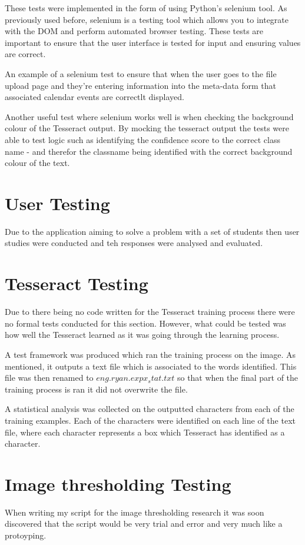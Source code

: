 These tests were implemented in the form of using Python's selenium tool. As previously used before, selenium is a testing tool which allows you to integrate with the DOM and perform automated browser testing. These tests are important to ensure that the user interface is tested for input and ensuring values are correct.

An example of a selenium test to ensure that when the user goes to the file upload page and they're entering information into the meta-data form that associated calendar events are correctlt displayed.

Another useful test where selenium works well is when checking the background colour of the Tesseract output. By mocking the tesseract output the tests were able to test logic such as identifying the confidence score to the correct class name - and therefor the classname being identified with the correct background colour of the text.
\section{User Testing}

Due to the application aiming to solve a problem with a set of students then user studies were conducted and teh responses were analysed and evaluated.

\section{Tesseract Testing}
Due to there being no code written for the Tesseract training process there were no formal tests conducted for this section. However, what could be tested was how well the Tesseract learned as it was going through the learning process.

A test framework was produced which ran the training process on the image. As mentioned, it outputs a text file which is associated to the words identified. This file was then renamed to $eng.ryan.expx_stat.txt$ so that when the final part of the training process is ran it did not overwrite the file.

A statistical analysis was collected on the outputted characters from each of the training examples. Each of the characters were identified on each line of the text file, where each character represents a box which Tesseract has identified as a character.




\section{Image thresholding Testing}
When writing my script for the image thresholding research it was soon discovered that the script would be very trial and error and very much like a protoyping.

